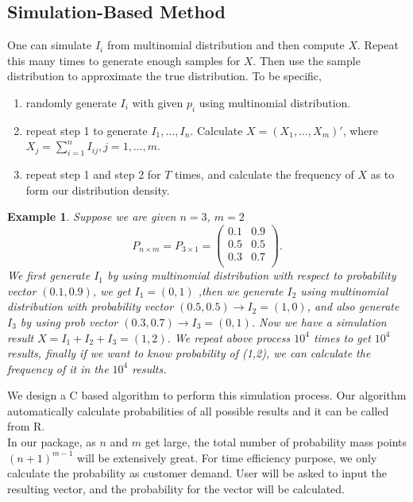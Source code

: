 \documentclass[12pt]{article}
\newtheorem{example}{Example}
\begin{document}
\subsection{Simulation-Based Method}
One can simulate $I_i$ from multinomial distribution and then compute $X$. Repeat this many times to generate enough samples for $X$. Then use the sample distribution to approximate the true distribution.
To be specific,
\begin{enumerate}[Step 1]
    \item randomly generate $I_i$ with given $p_i$ using multinomial distribution.
    \item repeat step 1 to generate $I_1,\dots,I_n$. Calculate $X = (X_1,\dots,X_{m})'$, where $X_j = \sum_{i=1}^{n}I_{ij}, j=1,\dots,m$.
    \item repeat step 1 and step 2 for $T$ times, and calculate the frequency of $X$ as to form our distribution density.
\end{enumerate}
\begin{example}
Suppose we are given $n=3$, $m=2$
\begin{equation*}
P_{n \times m} = P_{3 \times 1} = \begin{pmatrix}
0.1 & 0.9\\
0.5 & 0.5\\
0.3 & 0.7\\
\end{pmatrix}.
\end{equation*}
We first generate $I_1$ by using multinomial distribution with respect to probability vector $(0.1,0.9)$, we get $I_1 = (0,1)$  ,then we generate $I_2$ using multinomial distribution with probability vector $(0.5,0.5) \rightarrow I_2 = (1,0)$, and also generate $I_3$ by using prob vector $(0.3,0.7) \rightarrow I_3 = (0,1)$. Now we have a simulation result $X = I_1+I_2+I_3 = (1,2)$. We repeat above process $10^4$ times to get $10^4$ results, finally if we want to know probability of (1,2), we can calculate the frequency of it in the $10^4$ results.
\end{example}
We design a C based algorithm to perform this simulation process. Our algorithm automatically calculate probabilities of all possible results and it can be called from R.\\

In our package, as $n$ and $m$ get large, the total number of probability mass points $(n+1)^{m-1}$ will be extensively great. For time efficiency purpose, we only calculate the probability as customer demand. User will be asked to input the resulting vector, and the probability for the vector will be calculated.
\end{document}
